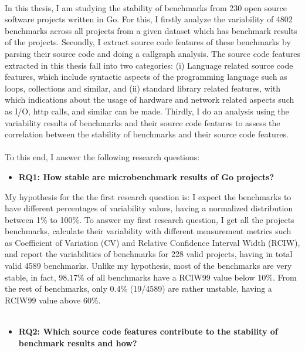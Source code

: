 \documentclass{seal_thesis}
\begin{document}
\\
In this thesis, I am studying the stability of benchmarks from 230 open source software projects written in Go. For this, I firstly analyze the variability of 4802 benchmarks across all projects from a given dataset which has benchmark results of the projects. Secondly, I extract source code features of these benchmarks by parsing their source code and doing a callgraph analysis. The source code features extracted in this thesis fall into two categories: (i) Language related source code features, which include syntactic aspects of the programming language such as loops, collections and similar, and (ii) standard library related features, with which indications about the usage of hardware and network related aspects such as I/O, http calls, and similar can be made. Thirdly, I do an analysis using the variability results of benchmarks and their source code features to assess the correlation between the stability of benchmarks and their source code features.\\
\\
To this end, I answer the following research questions: 

\begin{itemize}
	\item \textbf{RQ1: How stable are microbenchmark results of Go projects?}
\end{itemize}

\noindent My hypothesis for the the first research question is: I expect the benchmarks to have different percentages of variability values, having a normalized distribution between 1\% to 100\%. To answer my first research question, I get all the projects benchmarks, calculate their variability with different measurement metrics such as Coefficient of Variation (CV) and Relative Confidence Interval Width (RCIW), and report the variabilities of benchmarks for 228 valid projects, having in total valid 4589 benchmarks. Unlike my hypothesis, most of the benchmarks are very stable, in fact, 98.17\% of all benchmarks have a RCIW99 value below 10\%. From the rest of benchmarks, only 0.4\% (19/4589) are rather unstable, having a RCIW99 value above 60\%.\\
\\
\begin{itemize}
	\item \textbf{RQ2: Which source code features contribute to the stability of benchmark results and how?}
\end{itemize}
\end{document}
